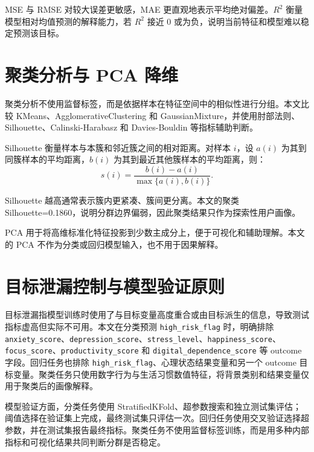 MSE 与 RMSE 对较大误差更敏感，MAE 更直观地表示平均绝对偏差。$R^2$ 衡量模型相对均值预测的解释能力，若 $R^2$ 接近 0 或为负，说明当前特征和模型难以稳定预测该目标。

\section{聚类分析与 PCA 降维}

聚类分析不使用监督标签，而是依据样本在特征空间中的相似性进行分组。本文比较 KMeans、AgglomerativeClustering 和 GaussianMixture，并使用肘部法则、Silhouette、Calinski-Harabasz 和 Davies-Bouldin 等指标辅助判断。

Silhouette 衡量样本与本簇和邻近簇之间的相对距离。对样本 $i$，设 $a(i)$ 为其到同簇样本的平均距离，$b(i)$ 为其到最近其他簇样本的平均距离，则：
\begin{equation}
s(i)=\frac{b(i)-a(i)}{\max\{a(i),b(i)\}}.
\end{equation}

Silhouette 越高通常表示簇内更紧凑、簇间更分离。本文的聚类 Silhouette=0.1860，说明分群边界偏弱，因此聚类结果只作为探索性用户画像。

PCA 用于将高维标准化特征投影到少数主成分上，便于可视化和辅助理解。本文的 PCA 不作为分类或回归模型输入，也不用于因果解释。

\section{目标泄漏控制与模型验证原则}

目标泄漏指模型训练时使用了与目标变量高度重合或由目标派生的信息，导致测试指标虚高但实际不可用。本文在分类预测 \texttt{high\_risk\_flag} 时，明确排除 \texttt{anxiety\_score}、\texttt{depression\_score}、\texttt{stress\_level}、\texttt{happiness\_score}、\texttt{focus\_score}、\texttt{productivity\_score} 和 \texttt{digital\_dependence\_score} 等 outcome 字段。回归任务也排除 \texttt{high\_risk\_flag}、心理状态结果变量和另一个 outcome 目标变量。聚类任务只使用数字行为与生活习惯数值特征，将背景类别和结果变量仅用于聚类后的画像解释。

模型验证方面，分类任务使用 StratifiedKFold、超参数搜索和独立测试集评估；阈值选择在验证集上完成，最终测试集只评估一次。回归任务使用交叉验证选择超参数，并在测试集报告最终指标。聚类任务不使用监督标签训练，而是用多种内部指标和可视化结果共同判断分群是否稳定。
